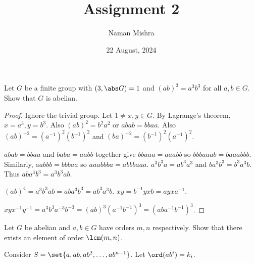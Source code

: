 \documentclass[12pt]{article}
\title{Assignment 2}
\author{Naman Mishra}
\date{22 August, 2024}
\begin{document}
\maketitle

\begin{problem}
    Let $G$ be a finite group with $(3, \abs G) = 1$
    and $(ab)^3 = a^3 b^3$ for all $a, b \in G$.
    Show that $G$ is abelian.
\end{problem}
\begin{proof}
    Ignore the trivial group.
    Let $1 \ne x, y \in G$.
    By Lagrange's theorem, $x = a^3, y = b^3$.
    Also $(ab)^2 = b^2 a^2$ or $abab = bbaa$.
    Also $(ab)^{-2} = (a^{-1})^2 (b^{-1})^2$
    and $(ba)^{-2} = (b^{-1})^2 (a^{-1})^2$.

    $abab = bbaa$ and $baba = aabb$ together give
    $bbaaa = aaabb$ so $bbbaaab = baaabbb$.
    Similarly, $aabbb = bbbaa$ so $aaabbba = abbbaaa$.
    $a^3 b^3 a = a b^3 a^3$ and $b a^3 b^3 = b^3 a^3 b$.
    Thus $ab a^3 b^3 = a^3 b^3 ab$.

    $(ab)^4 = a^3 b^3 ab = ab a^3 b^3 = a b^3 a^3 b$.
    $xy = b^{-1} yx b = a yx a^{-1}$.

    $xyx^{-1}y^{-1} = a^3 b^3 a^{-3} b^{-3} = (ab)^3 (a^{-1} b^{-1})^3
    = (ab a^{-1} b^{-1})^3$.
\end{proof}

\begin{problem}
    Let $G$ be abelian and $a, b \in G$ have orders $m, n$ respectively.
    Show that there exists an element of order $\lcm(m, n)$.
\end{problem}
\begin{solution}
    Consider $S = \set{a, ab, ab^2, \dots, ab^{n-1}}$.
    Let $\ord(ab^i) = k_i$.

\end{solution}
\end{document}
